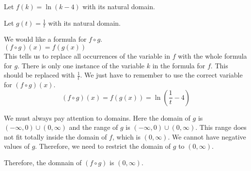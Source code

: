 \documentclass{ximera}
\begin{document}
\begin{example}


Let $f(k) = \ln(k - 4)$ with its natural domain.


Let $g(t) = \frac{1}{t}$ with its natural domain.



\begin{explanation}

We would like a formula for $f \circ g$. \\

$(f \circ g)(x) = f(g(x))$ \\

This tells us to replace all occurrences of the variable in $f$ with the whole formula for $g$.  There is only one instance of the variable $k$ in the formula for $f$.  This should be replaced with $\frac{1}{t}$. We just have to remember to use the correct variable for $(f \circ g)(x)$. \\



\[
(f \circ g)(x) = f(g(x)) = \ln\left( \frac{1}{t} - 4 \right)
\]




\end{explanation}


\begin{observation}


We must always pay attention to domains.  Here the domain of $g$ is $(-\infty, 0) \cup (0, \infty)$ and the range of $g$ is $(-\infty, 0) \cup (0, \infty)$.  This range does not fit totally inside the domain of $f$, which is $(0, \infty)$.  We cannot have negative values of $g$.  Therefore, we need to restrict the domain of $g$ to $(0, \infty)$.



Therefore, the domnain of $(f \circ g)$ is $(0, \infty)$.

\end{observation}


\end{example}
\end{document}
